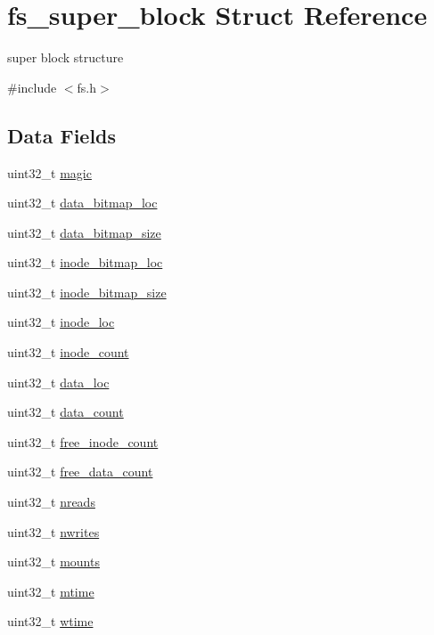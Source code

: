 \hypertarget{structfs__super__block}{}\section{fs\+\_\+super\+\_\+block Struct Reference}
\label{structfs__super__block}


super block structure  




{\ttfamily \#include $<$fs.\+h$>$}

\subsection*{Data Fields}
\begin{DoxyCompactItemize}
\item 
uint32\+\_\+t \mbox{\hyperlink{structfs__super__block_a88023897ee9909bf6ff9eca784d567e2}{magic}}
\item 
uint32\+\_\+t \mbox{\hyperlink{structfs__super__block_af8051b81bc195298cec178c726c84127}{data\+\_\+bitmap\+\_\+loc}}
\item 
uint32\+\_\+t \mbox{\hyperlink{structfs__super__block_ab6371fd268dc5744f7fe5df0968f6b83}{data\+\_\+bitmap\+\_\+size}}
\item 
uint32\+\_\+t \mbox{\hyperlink{structfs__super__block_a5e83f889d5db257bc33f950abd995f69}{inode\+\_\+bitmap\+\_\+loc}}
\item 
uint32\+\_\+t \mbox{\hyperlink{structfs__super__block_ae856dbcd9e4f0adcdbaa26f3ce7b8e81}{inode\+\_\+bitmap\+\_\+size}}
\item 
uint32\+\_\+t \mbox{\hyperlink{structfs__super__block_a8116de09befb4e9d92944f09d2b1da1b}{inode\+\_\+loc}}
\item 
uint32\+\_\+t \mbox{\hyperlink{structfs__super__block_a9e679848231dc7346ca94512086bdbda}{inode\+\_\+count}}
\item 
uint32\+\_\+t \mbox{\hyperlink{structfs__super__block_ac6a84fc2c9eba4a9582fa6d353ebfe48}{data\+\_\+loc}}
\item 
uint32\+\_\+t \mbox{\hyperlink{structfs__super__block_a8a0178409891f1219ced9c2fd1e0068b}{data\+\_\+count}}
\item 
uint32\+\_\+t \mbox{\hyperlink{structfs__super__block_a75c0f4cee23a5c4fc26aebb044e04b0c}{free\+\_\+inode\+\_\+count}}
\item 
uint32\+\_\+t \mbox{\hyperlink{structfs__super__block_a6459a0a9030ccf53627c0e9dae409ffb}{free\+\_\+data\+\_\+count}}
\item 
uint32\+\_\+t \mbox{\hyperlink{structfs__super__block_a342bcfecfe5c06a1f8026d4aa5d8c6a8}{nreads}}
\item 
uint32\+\_\+t \mbox{\hyperlink{structfs__super__block_ae8b149fd2b7f95fb0c277440604aabc7}{nwrites}}
\item 
uint32\+\_\+t \mbox{\hyperlink{structfs__super__block_a80a6cf210fcf039e50f9e461fc2d194c}{mounts}}
\item 
uint32\+\_\+t \mbox{\hyperlink{structfs__super__block_a9e20ccc1cc4eddf763de59d2e108084f}{mtime}}
\item 
uint32\+\_\+t \mbox{\hyperlink{structfs__super__block_a5d78b92b328dc31727f13679d9148cc0}{wtime}}
\end{DoxyCompactItemize}


